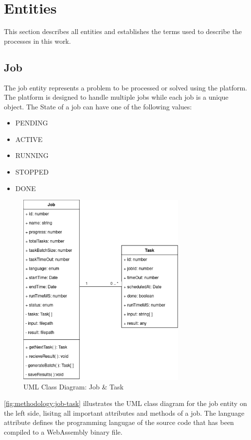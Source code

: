 \section{Entities}
\label{sec:methodology:entities}
This section describes all entities and establishes the terms used to describe the processes in this work.

\subsection{Job}
\label{subsec:methodology:entities:job}
The job entity represents a problem to be processed or solved using the platform. The platform is designed to handle multiple jobs while each job is a unique object. The State of a job can have one of the following values:
\begin{itemize}
  \item PENDING
  \item ACTIVE
  \item RUNNING
  \item STOPPED
  \item DONE
\end{itemize}
\begin{figure}[htbp]
  \centering
  \includegraphics[width=0.75\textwidth]{gfx/figures/Job-Task.png}
  \caption{\acs{UML} Class Diagram: Job \& Task}
  \label{fig:methodology:job-task}
\end{figure}
\autoref{fig:methodology:job-task} illustrates the \ac{UML} class diagram for the job entity on the left side, lisitng all important attributes and methods of a job. The language attribute defines the programming langugae of the source code that has been compiled to a WebAssembly binary file.


